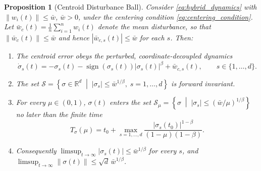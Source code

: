 \documentclass[11pt]{article}
\newtheorem{proposition}{Proposition}
\begin{document}
\begin{proposition}[Centroid Disturbance Ball]
Consider \eqref{eq:hybrid_dynamics} with $\|w_i(t)\| \le \bar{w}$, $\bar{w} > 0$, under the centering condition \eqref{eq:centering_condition}. Let $\bar{w}_c(t) = \frac{1}{n}\sum_{i=1}^{n} w_i(t)$ denote the mean disturbance, so that $\|\bar{w}_c(t)\| \le \bar{w}$ and hence $|\bar{w}_{c,s}(t)| \le \bar{w}$ for each $s$. Then:
\begin{enumerate}
    \item[(i)] The centroid error obeys the perturbed, coordinate-decoupled dynamics
    \begin{equation}
    \dot{\sigma}_s(t) = -\sigma_s(t) - \operatorname{sign}(\sigma_s(t))|\sigma_s(t)|^\beta + \bar{w}_{c,s}(t), \qquad s \in \{1,\dots,d\}.
    \label{eq:sigma_dyn_pert}
    \end{equation}
    \item[(ii)] The set $\mathcal{S} = \left\{ \sigma \in \mathbb{R}^d \;\middle|\; |\sigma_s| \le \bar{w}^{1/\beta}, \; s = 1,\dots,d \right\}$ is forward invariant.
    \item[(iii)] For every $\mu \in (0,1)$, $\sigma(t)$ enters the set $\mathcal{S}_\mu = \left\{ \sigma \;\middle|\; |\sigma_s| \le (\bar{w}/\mu)^{1/\beta} \right\}$ no later than the finite time
    \begin{equation}
    T_\sigma(\mu) = t_0 + \max_{s=1,\dots,d} \frac{|\sigma_s(t_0)|^{1-\beta}}{(1-\mu)(1-\beta)}.
    \label{eq:t_sigma}
    \end{equation}
    \item[(iv)] Consequently $\limsup_{t \to \infty} |\sigma_s(t)| \le \bar{w}^{1/\beta}$ for every $s$, and $\limsup_{t \to \infty} \|\sigma(t)\| \le \sqrt{d}\,\bar{w}^{1/\beta}$.
\end{enumerate}
\label{prop:centroid_ball}
\end{proposition}
\end{document}
